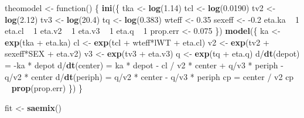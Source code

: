 \documentclass[]{book}
\newenvironment{Shaded}{\begin{snugshade}}{\end{snugshade}}
\newcommand{\KeywordTok}[1]{\textcolor[rgb]{0.13,0.29,0.53}{\textbf{{#1}}}}
\newcommand{\DecValTok}[1]{\textcolor[rgb]{0.00,0.00,0.81}{{#1}}}
\newcommand{\FloatTok}[1]{\textcolor[rgb]{0.00,0.00,0.81}{{#1}}}
\newcommand{\StringTok}[1]{\textcolor[rgb]{0.31,0.60,0.02}{{#1}}}
\newcommand{\NormalTok}[1]{{#1}}
\begin{document}
\begin{Shaded}
\begin{Highlighting}[]
\NormalTok{theomodel <-}\StringTok{ }\NormalTok{function() \{}
  \KeywordTok{ini}\NormalTok{(\{}
    \NormalTok{tka <-}\StringTok{ }\KeywordTok{log}\NormalTok{(}\FloatTok{1.14}\NormalTok{)}
    \NormalTok{tcl <-}\StringTok{ }\KeywordTok{log}\NormalTok{(}\FloatTok{0.0190}\NormalTok{)}
    \NormalTok{tv2  <-}\StringTok{ }\KeywordTok{log}\NormalTok{(}\FloatTok{2.12}\NormalTok{)}
    \NormalTok{tv3  <-}\StringTok{ }\KeywordTok{log}\NormalTok{(}\FloatTok{20.4}\NormalTok{)}
    \NormalTok{tq   <-}\StringTok{ }\KeywordTok{log}\NormalTok{(}\FloatTok{0.383}\NormalTok{)}
    \NormalTok{wteff  <-}\StringTok{ }\FloatTok{0.35}
    \NormalTok{sexeff <-}\StringTok{ }\NormalTok{-}\FloatTok{0.2}
    \NormalTok{eta.ka ~}\StringTok{ }\DecValTok{1}
    \NormalTok{eta.cl ~}\StringTok{ }\DecValTok{1}
    \NormalTok{eta.v2 ~}\StringTok{ }\DecValTok{1}
    \NormalTok{eta.v3 ~}\StringTok{ }\DecValTok{1}
    \NormalTok{eta.q ~}\StringTok{ }\DecValTok{1}
    \NormalTok{prop.err <-}\StringTok{ }\FloatTok{0.075}
  \NormalTok{\})}
  \KeywordTok{model}\NormalTok{(\{}
    \NormalTok{ka <-}\StringTok{ }\KeywordTok{exp}\NormalTok{(tka +}\StringTok{ }\NormalTok{eta.ka)}
    \NormalTok{cl <-}\StringTok{ }\KeywordTok{exp}\NormalTok{(tcl +}\StringTok{ }\NormalTok{wteff*lWT +}\StringTok{ }\NormalTok{eta.cl)}
    \NormalTok{v2 <-}\StringTok{ }\KeywordTok{exp}\NormalTok{(tv2 +}\StringTok{ }\NormalTok{sexeff*SEX +}\StringTok{ }\NormalTok{eta.v2)}
    \NormalTok{v3 <-}\StringTok{ }\KeywordTok{exp}\NormalTok{(tv3 +}\StringTok{ }\NormalTok{eta.v3)}
    \NormalTok{q  <-}\StringTok{ }\KeywordTok{exp}\NormalTok{(tq +}\StringTok{ }\NormalTok{eta.q)}
    \NormalTok{d/}\KeywordTok{dt}\NormalTok{(depot) =}\StringTok{ }\NormalTok{-ka *}\StringTok{ }\NormalTok{depot}
    \NormalTok{d/}\KeywordTok{dt}\NormalTok{(center) =}\StringTok{ }\NormalTok{ka *}\StringTok{ }\NormalTok{depot -}\StringTok{ }\NormalTok{cl /}\StringTok{ }\NormalTok{v2 *}\StringTok{ }\NormalTok{center +}\StringTok{ }\NormalTok{q/v3 *}\StringTok{ }\NormalTok{periph -}\StringTok{ }\NormalTok{q/v2 *}\StringTok{ }\NormalTok{center}
    \NormalTok{d/}\KeywordTok{dt}\NormalTok{(periph) =}\StringTok{ }\NormalTok{q/v2 *}\StringTok{ }\NormalTok{center -}\StringTok{ }\NormalTok{q/v3 *}\StringTok{ }\NormalTok{periph}
    \NormalTok{cp =}\StringTok{ }\NormalTok{center /}\StringTok{ }\NormalTok{v2}
    \NormalTok{cp ~}\StringTok{ }\KeywordTok{prop}\NormalTok{(prop.err)}
  \NormalTok{\})}
\NormalTok{\}}

\NormalTok{fit <-}\StringTok{ }\KeywordTok{saemix}\NormalTok{()}
\end{Highlighting}
\end{Shaded}
\end{document}
